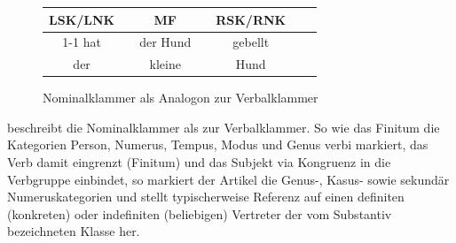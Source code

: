 \begin{figure}
  
  \begin{tabular}{cp{0.1em}cp{0.1em}cp{0.1em}c}
    LSK/LNK && MF && RSK/RNK && \\
    \cmidrule{1-1}\cmidrule{3-3}\cmidrule{5-5}
    hat && der Hund && gebellt \\
    der && kleine && Hund \\
  \end{tabular}
  \caption{Nominalklammer als Analogon zur Verbalklammer}
  \label{fig:Nominalklammer}
\end{figure}


\citet[355--356]{Weinrich2003} beschreibt die Nominalklammer als  zur Verbalklammer. So wie das Finitum die Kategorien Person, Numerus, Tempus, Modus und Genus verbi markiert, das Verb damit eingrenzt (Finitum) und das Subjekt via Kongruenz in die Verbgruppe einbindet, so markiert der Artikel die Genus-, Kasus- sowie sekundär Numeruskategorien und stellt typischerweise Referenz auf einen definiten (konkreten) oder indefiniten (beliebigen) Vertreter der vom Substantiv bezeichneten Klasse her. 

